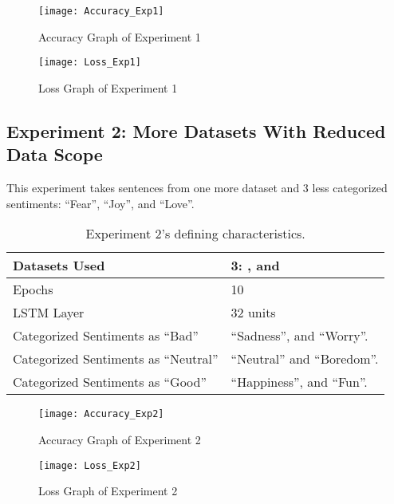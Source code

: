 \begin{figure}[!h]
	\centering
	\texttt{[image: Accuracy\_Exp1]}
	\caption{Accuracy Graph of Experiment 1}
	\label{fig:accuracy_exp1}
	\texttt{[image: Loss\_Exp1]}
	\caption{Loss Graph of Experiment 1}
	\label{fig:loss_exp1}
\end{figure}
\pagebreak

\subsection{Experiment 2: More Datasets With Reduced Data Scope}
\label{exp2}
This experiment takes sentences from one more dataset and 3 less categorized sentiments: ``Fear'', ``Joy'', and ``Love''.
\begin{table}[!th]
	\caption{Experiment 2's defining characteristics.}
	\vspace{0.5cm}
	\centering
	\begin{tabular}[t]{|l|l|}
	\hline
		Datasets Used & \makecell{3: \citet{d1}, \citet{d2} and\\ \citet{d3}}
	\\ \hline
		Epochs & 10
	\\ \hline
		LSTM Layer & 32 units
	\\ \hline
		Categorized Sentiments as ``Bad'' & ``Sadness'', and ``Worry''.
	\\ \hline	
		 Categorized Sentiments as ``Neutral'' & ``Neutral'' and ``Boredom''.
	\\ \hline	
		Categorized Sentiments as ``Good'' & ``Happiness'', and ``Fun''.
	\\ \hline
	\end{tabular}
\end{table}

\begin{figure}[!h]
	\centering
	\texttt{[image: Accuracy\_Exp2]}
	\caption{Accuracy Graph of Experiment 2}
	\label{fig:accuracy_exp2}
	\texttt{[image: Loss\_Exp2]}
	\caption{Loss Graph of Experiment 2}
	\label{fig:loss_exp2}
\end{figure}
\pagebreak

